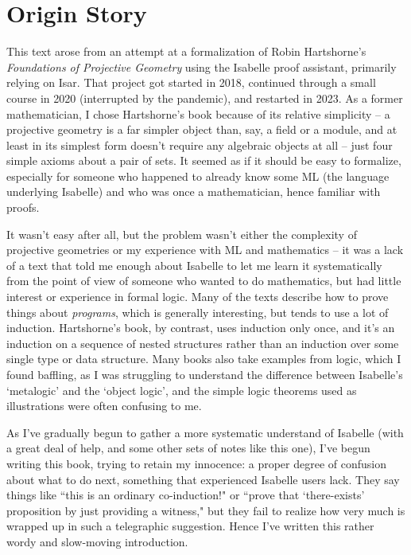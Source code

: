 \chapter*{Origin Story}
This text arose from an attempt at a formalization of Robin Hartshorne's \emph{Foundations of Projective Geometry}
using the Isabelle proof assistant, primarily relying on Isar. That project got started in 2018, continued through a small course in 2020 (interrupted by the pandemic), and restarted in 2023. As a former mathematician, I chose Hartshorne's book because of its relative simplicity -- a projective geometry is a far simpler object than, say, a field or a module, and at least in its simplest form doesn't require any algebraic objects at all -- just four simple axioms about a pair of sets. It seemed as if it should be easy to formalize, especially for someone who happened to already know some ML (the language underlying Isabelle) and who was once a mathematician, hence familiar with proofs. 

It wasn't easy after all, but the problem wasn't either the complexity of projective geometries or my experience with ML and mathematics -- it was a lack of a text that told me enough about Isabelle to let me learn it systematically from the point of view of someone who wanted to do mathematics, but had little interest or experience in formal logic. Many of the texts describe how to prove things about \textit{programs}, which is generally interesting, but tends to use a lot of induction. Hartshorne's book, by contrast, uses induction only once, and it's an induction on a sequence of nested structures rather than an induction over some single type or data structure. Many books also take examples from logic, which I found baffling, as I was struggling to understand the difference between Isabelle's `metalogic' and the `object logic', and the simple logic theorems used as illustrations were often confusing to me. 

As I've gradually begun to gather a more systematic understand of Isabelle (with a great deal of help, and some other sets of notes like this one), I've begun writing this book, trying to retain my innocence: a proper degree of confusion about what to do next, something that experienced Isabelle users lack. They say things like ``this is an ordinary co-induction!" or ``prove that `there-exists' proposition by just providing a witness," but they fail to realize how very much is wrapped up in such a telegraphic suggestion. Hence I've written this rather wordy and slow-moving introduction. 

